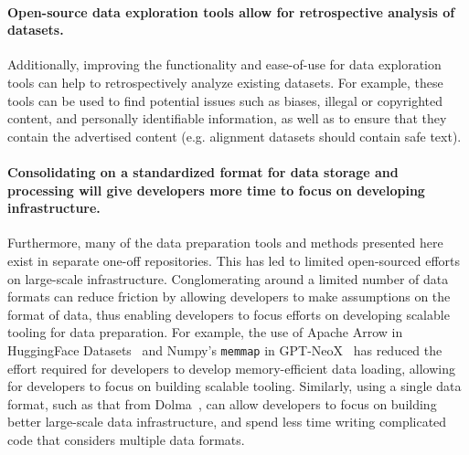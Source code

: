 \paragraph{Open-source data exploration tools allow for retrospective analysis of datasets.}
Additionally, improving the functionality and ease-of-use for data exploration tools can help to retrospectively analyze existing datasets. For example, these tools can be used to find potential issues such as biases, illegal or copyrighted content, and personally identifiable information, as well as to ensure that they contain the advertised content (e.g. alignment datasets should contain safe text).

\paragraph{Consolidating on a standardized format for data storage and processing will give developers more time to focus on developing infrastructure.}
Furthermore, many of the data preparation tools and methods presented here exist in separate one-off repositories.
This has led to limited open-sourced efforts on large-scale infrastructure.
Conglomerating around a limited number of data formats can reduce friction by allowing developers to make assumptions on the format of data, thus enabling developers to focus efforts on developing scalable tooling for data preparation.
For example, the use of Apache Arrow in HuggingFace Datasets~\citep{lhoest-etal-2021-datasets} and Numpy's \texttt{memmap} in GPT-NeoX~\citep{gpt-neox-library} has reduced the effort required for developers to develop memory-efficient data loading, allowing for developers to focus on building scalable tooling.
Similarly, using a single data format, such as that from Dolma~\citep{soldaini2024dolma}, can allow developers to focus on building better large-scale data infrastructure, and spend less time writing complicated code that considers multiple data formats.

